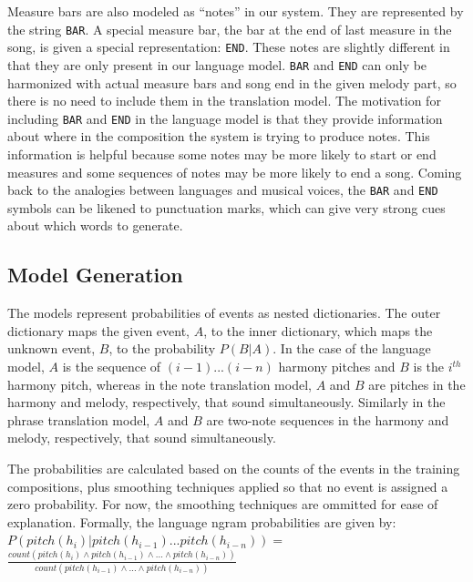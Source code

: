 \documentclass{sig-alternate}
\begin{document}
Measure bars are also modeled as ``notes'' in our system. They are represented by the string \texttt{BAR}. A special measure bar, the bar at the end of last measure in the song, is given a special representation: \texttt{END}. These notes are slightly different in that they are only present in our language model. \texttt{BAR} and \texttt{END} can only be harmonized with actual measure bars and song end in the given melody part, so there is no need to include them in the translation model. The motivation for including \texttt{BAR} and \texttt{END} in the language model is that they provide information about where in the composition the system is trying to produce notes. This information is helpful because some notes may be more likely to start or end measures and some sequences of notes may be more likely to end a song. Coming back to the analogies between languages and musical voices, the \texttt{BAR} and \texttt{END} symbols can be likened to punctuation marks, which can give very strong cues about which words to generate.

\subsection{Model Generation}
The models represent probabilities of events as nested dictionaries. The outer dictionary maps the given event, $A$, to the inner dictionary, which maps the unknown event, $B$, to the probability $P(B | A)$. In the case of the language model, $A$ is the sequence of $(i - 1) ... (i - n)$ harmony pitches and $B$ is the $i^{th}$ harmony pitch, whereas in the note translation model, $A$ and $B$  are pitches in the harmony and melody, respectively, that sound simultaneously. Similarly in the phrase translation model, $A$ and $B$ are two-note sequences in the harmony and melody, respectively, that sound simultaneously.

The probabilities are calculated based on the counts of the events in the training compositions, plus smoothing techniques applied so that no event is assigned a zero probability. For now, the smoothing techniques are ommitted for ease of explanation. Formally, the language ngram probabilities are given by: \\

$P(pitch(h_{i}) | pitch(h_{i - 1}) ... pitch(h_{i - n})) = $\\

$\frac{count(pitch(h_{i}) \wedge pitch(h_{i - 1}) \wedge ... \wedge pitch(h_{i - n}))}{count(pitch(h_{i - 1}) \wedge ... \wedge pitch(h_{i - n}))}$\\
\end{document}
